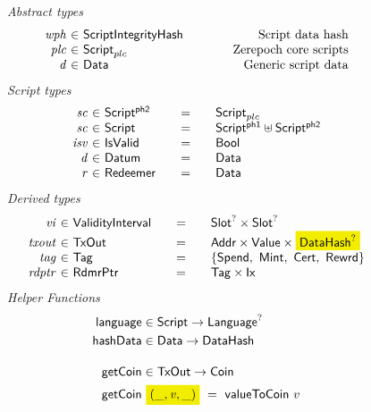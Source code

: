 \begin{figure*}[htb]
  \emph{Abstract types}
  \begin{equation*}
    \begin{array}{r@{~\in~}l@{\quad\quad\quad\quad}r}
      \var{wph} &\ScriptIntegrityHash & \text{Script data hash}\\
      \var{plc} & \ScriptZerepoch & \text{Zerepoch core scripts} \\
      \var{d} & \Data & \text{Generic script data}
    \end{array}
  \end{equation*}
  \emph{Script types}
  \begin{equation*}
    \begin{array}{r@{~\in~}l@{\qquad=\qquad}lr}
      \var{sc} & \ScriptPhTwo & \ScriptZerepoch \\
      \var{sc} & \Script & \ScriptPhOne \uniondistinct \ScriptPhTwo \\
      \var{isv} & \IsValid & \Bool \\
      \var{d} & \Datum & \Data \\
      \var{r} & \Redeemer & \Data
    \end{array}
  \end{equation*}
%
  \emph{Derived types}
  \begin{equation*}
    \begin{array}{r@{~\in~}l@{\qquad=\qquad}lr}
      \var{vi}
      & \ValidityInterval
      & \Slot^? \times \Slot^?
      \\
      \var{txout}
      & \TxOut
      & \Addr \times \Value \times \hldiff{\DataHash^?}
      \\
      \var{tag}
      & \Tag
      & \{\mathsf{Spend},~\mathsf{Mint},~\mathsf{Cert},~\mathsf{Rewrd}\}
      \\
      \var{rdptr}
      & \RdmrPtr
      & \Tag \times \Ix
    \end{array}
  \end{equation*}
  \emph{Helper Functions}
  \begin{align*}
    \fun{language}& \in \Script \to \Language^?\\
    \fun{hashData}& \in \Data \to \DataHash
    \nextdef
    \fun{getCoin}& \in \TxOut \to \Coin \\
    \fun{getCoin}&~\hldiff{{(\_, \var{v}, \_)}} ~=~\fun{valueToCoin}~{v}
  \end{align*}

\end{figure*}
